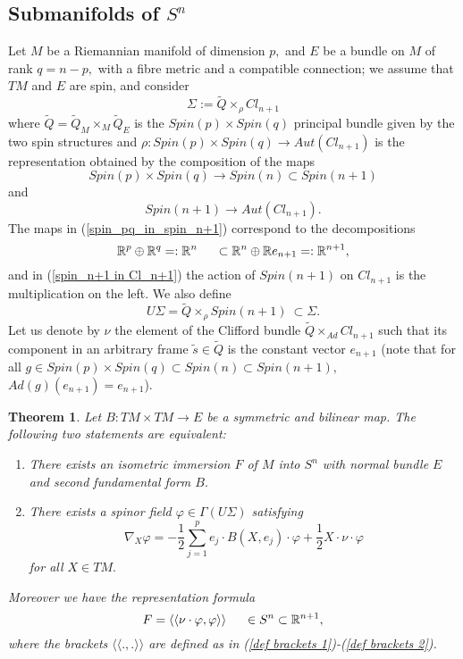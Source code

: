 \documentclass{amsart}
\newtheorem{thm}{Theorem}
\begin{document}
\subsection{Submanifolds of $S^n$}
Let $M$ be a Riemannian manifold of dimension $p,$ and $E$ be a bundle on $M$ of rank $q=n-p,$ with a fibre metric and a compatible connection; we assume that $TM$ and $E$ are spin, and consider
$$\Sigma:=\tilde{Q}\times_{\rho} Cl_{n+1}$$
where $\tilde{Q}=\tilde{Q}_M\times_M \tilde{Q}_E$ is the $Spin(p)\times Spin(q)$ principal bundle given by the two spin structures and $\rho:Spin(p)\times Spin(q)\rightarrow Aut(Cl_{n+1})$ is the representation obtained by the composition of the maps 
\begin{equation}\label{spin_pq_in_spin_n+1}
Spin(p)\times Spin(q)\rightarrow Spin(n)\subset Spin(n+1)
\end{equation}
and 
\begin{equation}\label{spin_n+1 in Cl_n+1}
Spin(n+1)\rightarrow Aut(Cl_{n+1}).
\end{equation}
The maps in (\ref{spin_pq_in_spin_n+1}) correspond to the decompositions
$${\mathbb{R}}^p\oplus{\mathbb{R}}^q=:{\mathbb{R}}^n\hspace{.5cm}\subset {\mathbb{R}}^n\oplus{\mathbb{R}} e_{n+1}=:{\mathbb{R}}^{n+1},$$ and in (\ref{spin_n+1 in Cl_n+1}) the action of $Spin(n+1)$ on $Cl_{n+1}$ is the multiplication on the left. We also define
$$U\Sigma=\tilde{Q}\times_{\rho} Spin(n+1)\ \subset \Sigma.$$
Let us denote by $\nu$ the element of the Clifford bundle $\tilde{Q}\times_{Ad} Cl_{n+1}$ such that its component in an arbitrary frame $\tilde{s}\in \tilde{Q}$ is the constant vector $e_{n+1}$ (note that for all $g\in Spin(p)\times Spin(q)\subset Spin(n)\subset Spin(n+1),$ $Ad(g)(e_{n+1})=e_{n+1}$).
\begin{thm}\label{thm rep Sn}
Let $B:TM\times TM\rightarrow E$ be a symmetric and bilinear map. The following two statements are equivalent:
\begin{enumerate}
\item There exists an isometric immersion $F$ of $M$ into $S^n$ with normal bundle $E$ and second fundamental form $B.$
\item There exists a spinor field $\varphi\in\Gamma(U\Sigma)$ satisfying
\begin{equation}\label{eqn phi Sn}
\nabla_X\varphi=-\frac{1}{2}\sum_{j=1}^pe_j\cdot B(X,e_j)\cdot\varphi+\frac{1}{2} X\cdot\nu\cdot\varphi
\end{equation}
for all $X\in TM.$
\end{enumerate}
Moreover we have the representation formula
\begin{equation}\label{formula F Sn}
F=\langle\langle\nu\cdot\varphi,\varphi\rangle\rangle\hspace{.5cm}\in S^n\subset{\mathbb{R}}^{n+1},
\end{equation}
where the brackets $\langle\langle.,.\rangle\rangle$ are defined as in (\ref{def brackets 1})-(\ref{def brackets 2}).
\end{thm}
\end{document}
